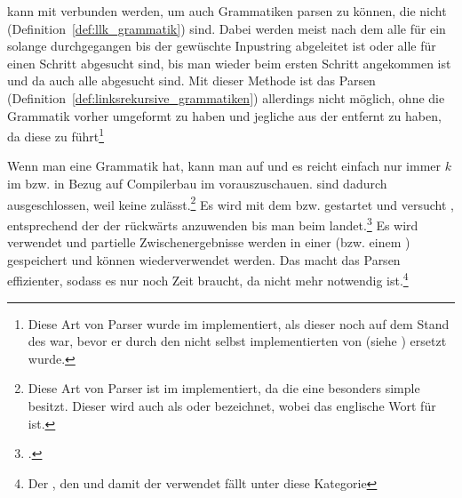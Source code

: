 \begin{Special_Paragraph}
\begin{itemize}[itemsep=-1mm, topsep=-1mm]
   kann mit  verbunden werden, um auch Grammatiken parsen zu können, die nicht  (Definition~\ref{def:llk_grammatik}) sind. Dabei werden meist nach dem  alle  für ein  solange durchgegangen bis der gewüschte Inpustring abgeleitet ist oder alle  für einen Schritt abgesucht sind, bis man wieder beim ersten Schritt angekommen ist und da auch alle  abgesucht sind. Mit dieser Methode ist das Parsen  (Definition~\ref{def:linksrekursive_grammatiken}) allerdings nicht möglich, ohne die Grammatik vorher umgeformt zu haben und jegliche  aus der  entfernt zu haben, da diese zu  führt\footnote{Diese Art von Parser wurde im  implementiert, als dieser noch auf dem Stand des  war, bevor er durch den nicht selbst implementierten  von  (siehe \cite{noauthor_lark_2022}) ersetzt wurde.}

  Wenn man eine  Grammatik hat, kann man auf  und es reicht einfach nur immer $k$  im  bzw. in Bezug auf Compilerbau  im  vorauszuschauen.  sind dadurch ausgeschlossen, weil  keine  zulässt.\footnote{Diese Art von Parser ist im  implementiert, da die  eine besonders simple  besitzt. Dieser  wird auch als  oder  bezeichnet, wobei  das englische Wort für  ist.}
   Es wird mit dem  bzw.  gestartet und versucht , entsprechend der  der  rückwärts anzuwenden bis man beim  landet.\footcite{noauthor_what_nodate-1}
   Es wird  verwendet und partielle Zwischenergebnisse werden in einer  (bzw. einem ) gespeichert und können wiederverwendet werden. Das macht das Parsen  effizienter, sodass es nur noch  Zeit braucht, da  nicht mehr notwendig ist.\footnote{Der , den  und damit der  verwendet fällt unter diese Kategorie}
\end{itemize}
\end{Special_Paragraph}

